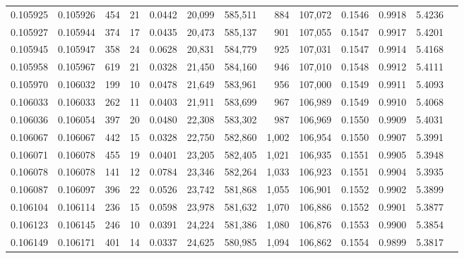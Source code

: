 \begin{tabular}{rrrrrrrrrrrrr}
0.105925 & 0.105926 &   454 &  21 &                                     0.0442 &  20,099 & 585,511 &     884 & 107,072 & 0.1546 & 0.9918 & 5.4236 \\
0.105927 & 0.105944 &   374 &  17 &                                     0.0435 &  20,473 & 585,137 &     901 & 107,055 & 0.1547 & 0.9917 & 5.4201 \\
0.105945 & 0.105947 &   358 &  24 &                                     0.0628 &  20,831 & 584,779 &     925 & 107,031 & 0.1547 & 0.9914 & 5.4168 \\
0.105958 & 0.105967 &   619 &  21 &                                     0.0328 &  21,450 & 584,160 &     946 & 107,010 & 0.1548 & 0.9912 & 5.4111 \\
0.105970 & 0.106032 &   199 &  10 &                                     0.0478 &  21,649 & 583,961 &     956 & 107,000 & 0.1549 & 0.9911 & 5.4093 \\
0.106033 & 0.106033 &   262 &  11 &                                     0.0403 &  21,911 & 583,699 &     967 & 106,989 & 0.1549 & 0.9910 & 5.4068 \\
0.106036 & 0.106054 &   397 &  20 &                                     0.0480 &  22,308 & 583,302 &     987 & 106,969 & 0.1550 & 0.9909 & 5.4031 \\
0.106067 & 0.106067 &   442 &  15 &                                     0.0328 &  22,750 & 582,860 &   1,002 & 106,954 & 0.1550 & 0.9907 & 5.3991 \\
0.106071 & 0.106078 &   455 &  19 &                                     0.0401 &  23,205 & 582,405 &   1,021 & 106,935 & 0.1551 & 0.9905 & 5.3948 \\
0.106078 & 0.106078 &   141 &  12 &                                     0.0784 &  23,346 & 582,264 &   1,033 & 106,923 & 0.1551 & 0.9904 & 5.3935 \\
0.106087 & 0.106097 &   396 &  22 &                                     0.0526 &  23,742 & 581,868 &   1,055 & 106,901 & 0.1552 & 0.9902 & 5.3899 \\
0.106104 & 0.106114 &   236 &  15 &                                     0.0598 &  23,978 & 581,632 &   1,070 & 106,886 & 0.1552 & 0.9901 & 5.3877 \\
0.106123 & 0.106145 &   246 &  10 &                                     0.0391 &  24,224 & 581,386 &   1,080 & 106,876 & 0.1553 & 0.9900 & 5.3854 \\
0.106149 & 0.106171 &   401 &  14 &                                     0.0337 &  24,625 & 580,985 &   1,094 & 106,862 & 0.1554 & 0.9899 & 5.3817 \\

\end{tabular}
